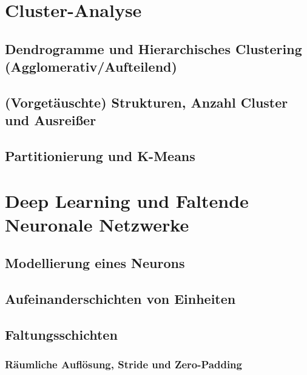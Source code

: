 \chapter{Cluster-Analyse} %

	\section{Dendrogramme und Hierarchisches Clustering (Agglomerativ/Aufteilend)} %

	\section{(Vorgetäuschte) Strukturen, Anzahl Cluster und Ausreißer} %

	\section{Partitionierung und K-Means} %

\chapter{Deep Learning und Faltende Neuronale Netzwerke} %
	\label{c:deepLearning}


	\section{Modellierung eines Neurons} %

	\section{Aufeinanderschichten von Einheiten} %

	\section{Faltungsschichten} %

		\subsection{Räumliche Auflösung, Stride und Zero-Padding} %

